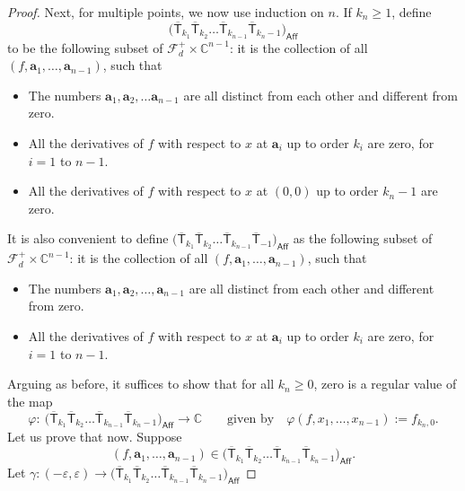 \begin{proof}
Next, for multiple points, we now use induction on
$n$. If $k_n \geq 1$, define
\[\bigl(\overline{\mathsf{T}}_{k_1} \overline{\mathsf{T}}_{k_2}
\dots \overline{\mathsf{T}}_{k_{n-1}} \overline{\mathsf{T}}_{k_{n}-1}\bigr)_{\mathsf{Aff}}
\]
to be the following subset of $\mathcal{F}_d^{+} \times \mathbb{C}^{n-1}$: it is
the collection of all $(f, \mathbf{a}_1, \dots, \mathbf{a}_{n-1})$, such that
\begin{itemize}\itemsep=0pt
\item The numbers
$\mathbf{a}_1, \mathbf{a}_2, \dots \mathbf{a}_{n-1}$ are all distinct
from each other and different from zero.
\item All the derivatives of $f$ with respect to $x$
at $\mathbf{a}_i$ up to order $k_i$ are zero, for $i=1$ to $n-1$.
\item All the derivatives of $f$ with respect to $x$
at $(0, 0)$ up to order $k_n-1$ are zero.
\end{itemize}
It is also convenient to define
$\bigl(\overline{\mathsf{T}}_{k_1} \overline{\mathsf{T}}_{k_2}
\dots \overline{\mathsf{T}}_{k_{n-1}} \overline{\mathsf{T}}_{-1}\bigr)_{\mathsf{Aff}}$
as the following subset of $\mathcal{F}_d^{+} \times \mathbb{C}^{n-1}$: it is
the collection of all $(f, \mathbf{a}_1, \dots, \mathbf{a}_{n-1})$, such that
\begin{itemize}\itemsep=0pt
\item The numbers
$\mathbf{a}_1, \mathbf{a}_2, \dots , \mathbf{a}_{n-1}$ are all distinct
from each other and different from zero.
\item All the derivatives of $f$ with respect to $x$
at $\mathbf{a}_i$ up to order $k_i$ are zero, for $i=1$ to $n-1$.
\end{itemize}
Arguing as before,
it suffices to show that for all $k_n \geq 0$, zero is a regular value of the map
\[\varphi \colon\ \bigl(\overline{\mathsf{T}}_{k_1} \overline{\mathsf{T}}_{k_2}
\dots \overline{\mathsf{T}}_{k_{n-1}} \overline{\mathsf{T}}_{k_{n}-1}\bigr)_{\mathsf{Aff}}
 \longrightarrow \mathbb{C} \qquad \text{given by}
\quad \varphi(f, x_1, \dots, x_{n-1}) := f_{k_n, 0}. \]
Let us prove that now. Suppose
\[(f,\mathbf{a}_1, \dots, \mathbf{a}_{n-1})
\in \bigl(\overline{\mathsf{T}}_{k_1} \overline{\mathsf{T}}_{k_2}
\dots \overline{\mathsf{T}}_{k_{n-1}} \overline{\mathsf{T}}_{k_{n}-1}\bigr)_{\mathsf{Aff}}.\]
Let $\gamma\colon(-\varepsilon, \varepsilon)\longrightarrow
\bigl(\overline{\mathsf{T}}_{k_1} \overline{\mathsf{T}}_{k_2}
\dots \overline{\mathsf{T}}_{k_{n-1}} \overline{\mathsf{T}}_{k_{n}-1}\bigr)_{\mathsf{Aff}}$

\end{proof}
